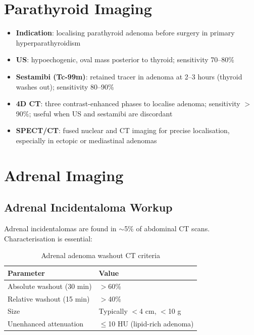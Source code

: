 \section{Parathyroid Imaging}
\begin{itemize}
  \item \textbf{Indication}: localising parathyroid adenoma before surgery in primary hyperparathyroidism
  \item \textbf{US}: hypoechogenic, oval mass posterior to thyroid; sensitivity 70--80\%
  \item \textbf{Sestamibi (Tc-99m)}: retained tracer in adenoma at 2--3 hours (thyroid washes out); sensitivity 80--90\%
  \item \textbf{4D CT}: three contrast-enhanced phases to localise adenoma; sensitivity $>$90\%; useful when US and sestamibi are discordant
  \item \textbf{SPECT/CT}: fused nuclear and CT imaging for precise localisation, especially in ectopic or mediastinal adenomas
\end{itemize}

\section{Adrenal Imaging}

\subsection{Adrenal Incidentaloma Workup}
Adrenal incidentalomas are found in $\sim$5\% of abdominal CT scans. Characterisation is essential:

\begin{table}[h]
\centering
\caption{Adrenal adenoma washout CT criteria}
\begin{tabular}{|l|l|}
\hline
\textbf{Parameter} & \textbf{Value} \\
\hline
Absolute washout (30 min) & $>$60\% \\
Relative washout (15 min) & $>$40\% \\
Size & Typically $<$4 cm, $<$10 g \\
Unenhanced attenuation & $\leq$10 HU (lipid-rich adenoma) \\
\hline
\end{tabular}
\end{table}

